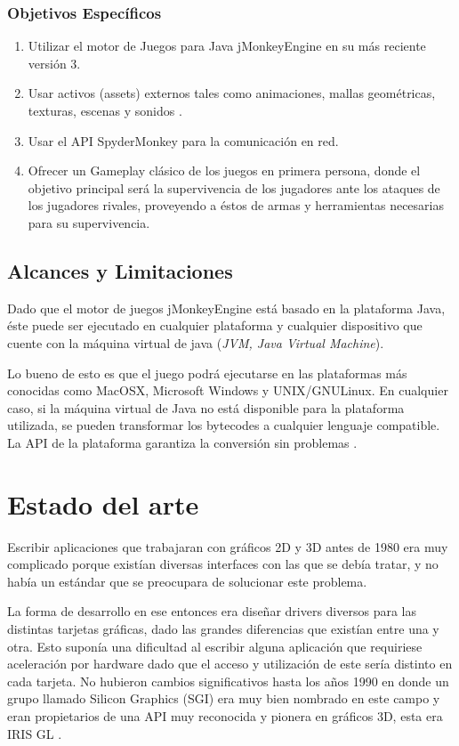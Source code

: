 \documentclass[a4paper,12pt,openany,oneside]{book}
\begin{document}
\subsection{Objetivos Específicos}
\begin{enumerate}
\item Utilizar el motor de Juegos para Java jMonkeyEngine en su más reciente versión 3.
\item Usar activos (assets) externos tales como animaciones, mallas geométricas, texturas, escenas y sonidos \cite{JMONKEY}.
\item Usar el API SpyderMonkey \cite{BEGINNERS} para la comunicación en red.
\item Ofrecer un Gameplay clásico de los juegos en primera persona, donde el objetivo principal será la supervivencia de los jugadores ante los ataques de los jugadores rivales, proveyendo a éstos de armas y herramientas
necesarias para su supervivencia.
\end{enumerate}
\section{Alcances y Limitaciones}
Dado que el motor de juegos jMonkeyEngine está basado en la plataforma Java, éste puede ser ejecutado en cualquier plataforma y cualquier dispositivo que cuente con la máquina virtual de java (\textit{JVM, Java Virtual Machine}).

Lo bueno de esto es que el juego podrá ejecutarse en las plataformas más conocidas como MacOSX, Microsoft Windows y UNIX/GNULinux. En cualquier caso, si la máquina virtual de Java no está disponible para la plataforma utilizada, se pueden transformar los bytecodes a cualquier lenguaje compatible. La API de la plataforma garantiza la conversión sin problemas \cite{JMONKEY}.
\chapter{Estado del arte}
Escribir aplicaciones que trabajaran con gráficos 2D y 3D antes de 1980 era muy complicado porque existían diversas interfaces con las que se debía tratar, y no había un estándar que se preocupara de solucionar este problema.

La forma de desarrollo en ese entonces era diseñar drivers diversos para las distintas tarjetas gráficas, dado las grandes diferencias que existían entre una y otra. Esto suponía una dificultad al escribir alguna aplicación que requiriese aceleración por hardware dado que el acceso y utilización de este sería distinto en cada tarjeta. No hubieron cambios significativos hasta los años 1990 en donde un grupo llamado Silicon Graphics (SGI) era muy bien nombrado en este campo y eran propietarios de una API muy reconocida y pionera en gráficos 3D, esta era IRIS GL \cite{WIKIOGL}.
\end{document}
